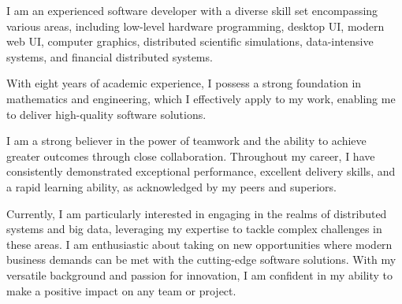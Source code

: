 

\begin{cvparagraph}

I am an experienced software developer with a diverse skill set encompassing various areas, including low-level hardware programming, desktop UI, modern web UI, computer graphics, distributed scientific simulations, data-intensive systems, and financial distributed systems.

With eight years of academic experience, I possess a strong foundation in mathematics and engineering, which I effectively apply to my work, enabling me to deliver high-quality software solutions.

I am a strong believer in the power of teamwork and the ability to achieve greater outcomes through close collaboration. Throughout my career, I have consistently demonstrated exceptional performance, excellent delivery skills, and a rapid learning ability, as acknowledged by my peers and superiors.

Currently, I am particularly interested in engaging in the realms of distributed systems and big data, leveraging my expertise to tackle complex challenges in these areas. I am enthusiastic about taking on new opportunities where modern business demands can be met with the cutting-edge software solutions. With my versatile background and passion for innovation, I am confident in my ability to make a positive impact on any team or project.

\end{cvparagraph}
